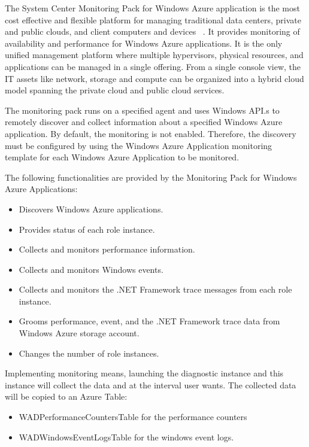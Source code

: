 \documentclass{sig-alternate}
\begin{document}
The System Center Monitoring Pack for Windows Azure application is the most cost effective and flexible platform for managing traditional data centers, private and public clouds, and client computers and devices ~\cite{MonitoringPackAzure11}. It provides monitoring of availability and performance for Windows Azure applications. It is the only unified management platform where multiple hypervisors, physical resources, and applications can be managed in a single offering. From a single console view, the IT assets like network, storage and compute can be organized into a hybrid cloud model spanning the private cloud and public cloud services.

The monitoring pack runs on a specified agent and uses Windows API.s to remotely discover and collect information about a specified Windows Azure application. By default, the monitoring is not enabled. Therefore, the discovery must be configured by using the Windows Azure Application monitoring template for each Windows Azure Application to be monitored.

The following functionalities are provided by the Monitoring Pack for Windows Azure Applications:

\begin{itemize}
 \item Discovers Windows Azure applications.
 \item Provides status of each role instance.
 \item Collects and monitors performance information.
 \item Collects and monitors Windows events.
 \item Collects and monitors the .NET Framework trace messages from each role instance.
 \item Grooms performance, event, and the .NET Framework trace data from Windows Azure storage account.
 \item Changes the number of role instances.
\end{itemize}

Implementing monitoring means, launching the diagnostic instance and this instance will collect the data and at the interval user wants. The collected data will be copied to an Azure Table:

\begin{itemize}
\item WADPerformanceCountersTable for the performance counters
\item WADWindowsEventLogsTable for the windows event logs.
\end{itemize}
\end{document}
